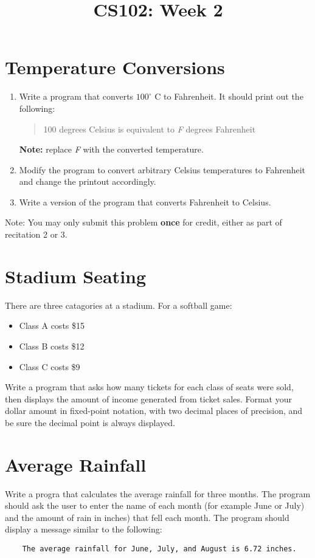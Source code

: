 \documentclass{article}
\begin{document}
\title{CS102: Week 2}

\maketitle

\section{Temperature Conversions}
\begin{enumerate}
\item Write a program that converts $100^{\circ}$ C to Fahrenheit. It should print out the following:
	\begin{quote}
	100 degrees Celsius is equivalent to \textit{F} degrees Fahrenheit
	\end{quote}
\textbf{Note:} replace \textit{F} with the converted temperature. 
\item Modify the program to convert arbitrary Celsius temperatures to Fahrenheit and change the printout accordingly.
\item Write a version of the program that converts Fahrenheit to Celsius. 
\end{enumerate}
Note: You may only submit this problem \textbf{once} for credit, either as part of recitation 2 or 3.

\section{Stadium Seating}
There are three catagories at a stadium. For a softball game:
\begin{itemize}
	\item Class A costs \$15
	\item Class B costs \$12
	\item Class C costs \$9
\end{itemize}
Write a program that asks how many tickets for each class of seats were sold, then displays the amount of income generated from ticket sales. Format your dollar amount in fixed-point notation, with two decimal places of precision, and be sure the decimal point is always displayed. 

\section{Average Rainfall}
Write a progra that calculates the average rainfall for three months. The program should ask the user to enter the name of each month (for example June or July) and the amount of rain in inches) that fell each month. The program should display a message similar to the following:
\begin{verbatim}
	The average rainfall for June, July, and August is 6.72 inches. 
\end{verbatim}
\break
\end{document}
